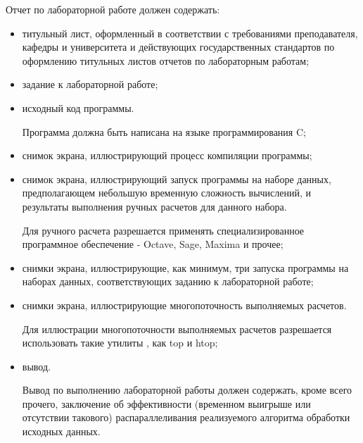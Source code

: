 
Отчет по лабораторной работе должен содержать:

\begin{itemize}

	\item титульный лист, оформленный в соответствии с требованиями преподавателя, кафедры и университета и действующих государственных стандартов по оформлению титульных листов отчетов по лабораторным работам;
	
	\item задание к лабораторной работе;

	\item исходный код программы.

	Программа должна быть написана на языке программирования C;

	\item снимок экрана, иллюстрирующий процесс компиляции программы;

	\item снимок экрана, иллюстрирующий запуск программы на наборе данных, предполагающем небольшую временную сложность вычислений, и результаты выполнения ручных расчетов для данного набора.

	Для ручного расчета разрешается применять специализированное программное обеспечение - Octave, Sage, Maxima и прочее;

	\item снимки экрана, иллюстрирующие, как минимум, три запуска программы на наборах данных, соответствующих заданию к лабораторной работе;

	\item снимки экрана, иллюстрирующие многопоточность выполняемых расчетов.

	Для иллюстрации многопоточности выполняемых расчетов разрешается использовать такие утилиты \gl, как top и htop;

	\item вывод.

	Вывод по выполнению лабораторной работы должен содержать, кроме всего прочего, заключение об эффективности (временном выигрыше или отсутствии такового) распараллеливания реализуемого алгоритма обработки исходных данных.

\end{itemize}

